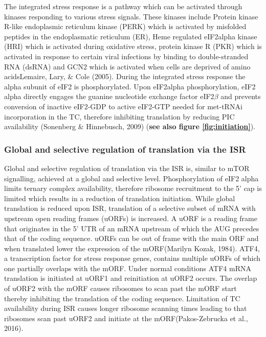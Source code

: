 \documentclass[
  12pt,
  openany]{book}
\begin{document}
The integrated stress response is a pathway which can be activated through kinases responding to various stress signals. These kinases include Protein kinase R-like endoplasmic reticulum kinase (PERK) which is activated by misfolded peptides in the endoplasmatic reticulum (ER), Heme regulated eIF2alpha kinase (HRI) which is activated during oxidative stress, protein kinase R (PKR) which is activated in response to certain viral infections by binding to double-stranded RNA (dsRNA) and GCN2 which is activated when cells are deprived of amino acidsLemaire, Lary, \& Cole (2005). During the integrated stress response the alpha subunit of eIF2 is phosphorylated. Upon eIF2alpha phosphorylation, eIF2 alpha directly engages the guanine nucleotide exchange factor eIF2\(\beta\) and prevents conversion of inactive eIF2-GDP to active eIF2-GTP needed for met-tRNAi incorporation in the TC, therefore inhibiting translation by reducing PIC availability (Sonenberg \& Hinnebusch, 2009) (\textbf{see also figure \ref{fig:initiation}}).

\subsubsection{Global and selective regulation of translation via the ISR}

Global and selective regulation of translation via the ISR is, similar to mTOR signalling, achieved at a global and selective level. Phosphorylation of eIF2 alpha limits ternary complex availability, therefore ribosome recruitment to the 5' cap is limited which results in a reduction of translation initiation. While global translation is reduced upon ISR, translation of a selective subset of mRNA with upstream open reading frames (uORFs) is increased. A uORF is a reading frame that originates in the 5' UTR of an mRNA upstream of which the AUG precedes that of the coding sequence. uORFs can be out of frame with the main ORF and when translated lower the expression of the mORF(Marilyn Kozak, 1984). ATF4, a transcription factor for stress response genes, contains multiple uORFs of which one partially overlaps with the mORF. Under normal conditions ATF4 mRNA translation is initiated at uORF1 and reinitiation at uORF2 occurs. The overlap of uORF2 with the mORF causes ribosomes to scan past the mORF start thereby inhibiting the translation of the coding sequence. Limitation of TC availability during ISR causes longer ribosome scanning times leading to that ribosomes scan past uORF2 and initiate at the mORF(Pakos-Zebrucka et al., 2016).
\end{document}
